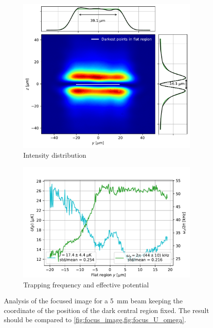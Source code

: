 \begin{figure}
    \centering
    \hfill
    \begin{subfigure}{0.4\textwidth}
        \includegraphics[width=\textwidth]{chapters/chapter_3/figures/fixedline.pdf}
        \caption{Intensity distribution}
        \label{fig:int_fixedline}
    \end{subfigure}
    \hfill
    \begin{subfigure}{0.5\textwidth}
        \includegraphics[width=\textwidth]{chapters/chapter_3/figures/trap_fixedline.pdf}
        \caption{Trapping frequency and effective potential}
        \label{fig:trap_fixedline}
    \end{subfigure}
    \hfill
    \caption{Analysis of the focused image for a \SI{5}{mm} beam keeping the coordinate of the position of the dark central region fixed. The result should be compared to \cref{fig:focus_image,fig:focus_U_omega}.}
    \label{fig:fixedline}
\end{figure}

